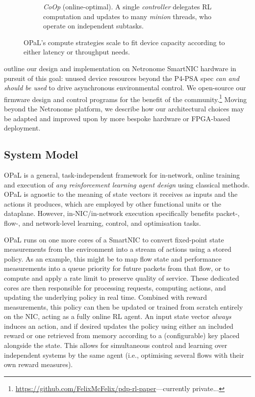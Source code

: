 \documentclass[sigconf,natbib=false]{acmart}
\newcommand{\approachshort}{OPaL}
\newcommand{\Coopfw}{\emph{CoOp}}
\begin{document}
\begin{figure}
\begin{subfigure}{0.45\linewidth}
		\caption{\Coopfw{} (online-optimal). A single \emph{controller} delegates RL computation and updates to many \emph{minion} threads, who operate on independent subtasks.\label{fig:single-and-parallel:parallel}}
	\end{subfigure}
	\caption{\approachshort{}'s compute strategies scale to fit device capacity according to either latency or throughput needs.\label{fig:single-and-parallel}}
\end{figure}

 outline our design and implementation on Netronome SmartNIC hardware in pursuit of this goal: unused device resources beyond the P4-PSA spec \emph{can and should be used} to drive asynchronous environmental control.
We open-source our firmware design and control programs for the benefit of the community.\footnote{\url{https://github.com/FelixMcFelix/pdp-rl-paper}---currently private...}
Moving beyond the Netronome platform, we describe how our architectural choices may be adapted and improved upon by more bespoke hardware or FPGA-based deployment.

\subsection{System Model}
\approachshort{} is a general, task-independent framework for in-network, online training and execution of \emph{any reinforcement learning agent design} using classical methods.
\approachshort{} is agnostic to the meaning of state vectors it receives as inputs and the actions it produces, which are employed by other functional units or the dataplane.
However, in-NIC/in-network execution specifically benefits packet-, flow-, and network-level learning, control, and optimisation tasks.

\approachshort{} runs on one more cores of a SmartNIC to convert fixed-point state measurements from the environment into a stream of actions using a stored policy.
As an example, this might be to map flow state and performance measurements into a queue priority for future packets from that flow, or to compute and apply a rate limit to preserve quality of service.
These dedicated cores are then responsible for processing requests, computing actions, and updating the underlying policy in real time.
Combined with reward measurements, this policy can then be updated or trained from scratch entirely on the NIC, acting as a fully online RL agent.
An input state vector \emph{always} induces an action, and if desired updates the policy using either an included reward or one retrieved from memory according to a (configurable) key placed alongside the state.
This allows for simultaneous control and learning over independent systems by the same agent (i.e., optimising several flows with their own reward measures).
\end{document}
